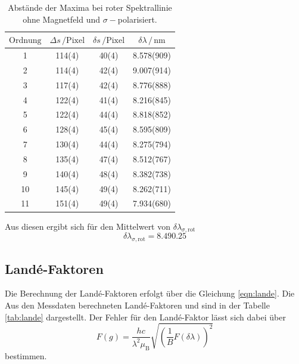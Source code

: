 \begin{table}
    \centering
    \caption{Abstände der Maxima bei roter Spektrallinie ohne Magnetfeld und $\sigma-$polarisiert.}
    \label{tab:maxima_rot_sigma}
    \begin{tabular}{S S S S}
        \toprule
        $\text{Ordnung}$ & $\Delta s \, /\text{Pixel}$  & $\delta s \, /\text{Pixel}$ & $\delta \lambda \, / \, \si{\nano\meter}$  \\
          & 114(4) & 40(4)  &  8.578(909) \\ 
        2  & 114(4) & 42(4)  &  9.007(914) \\
        3  & 117(4) & 42(4)  &  8.776(888) \\
        4  & 122(4) & 41(4)  &  8.216(845) \\
        5  & 122(4) & 44(4)  &  8.818(852) \\ 
        6  & 128(4) & 45(4)  &  8.595(809) \\
        7  & 130(4) & 44(4)  &  8.275(794) \\
        8  & 135(4) & 47(4)  &  8.512(767) \\
        9  & 140(4) & 48(4)  &  8.382(738) \\
        10 & 145(4) & 49(4)  &  8.262(711) \\
        11 & 151(4) & 49(4)  &  7.934(680) \\
        \bottomrule

    \end{tabular}
\end{table}

Aus diesen ergibt sich für den Mittelwert von $\delta\lambda_{\sigma,\text{rot}}$
\begin{equation}
    \delta\lambda_{\sigma,\text{rot}} = 8.49 0.25
\end{equation}

\subsection{Landé-Faktoren}

Die Berechnung der Landé-Faktoren erfolgt über die Gleichung \ref{eqn:lande}. Die Aus den Messdaten berechneten Landé-Faktoren und  
sind in der Tabelle \ref{tab:lande} dargestellt. Der Fehler für den Landé-Faktor lässt sich dabei über 
\begin{equation}
    F(g) = \frac{hc}{\lambda^2 \mu _\text{B}} \sqrt{\left ( \frac{1}{B} F(\delta \lambda) \right)^2}
\end{equation} bestimmen. 

